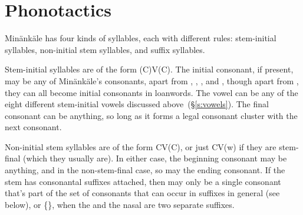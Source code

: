 \section{Phonotactics}
Min\"ank\"ale has four kinds of syllables, each with different rules:
stem-initial syllables, non-initial stem syllables, and suffix syllables.

Stem-initial syllables are of the form (C)V(C). The initial consonant, if
present, may be any of Min\"ank\"ale's consonants, apart from , ,
, and , though apart from , they can all become initial
consonants in loanwords. The vowel can be any of the eight different
stem-initial vowels discussed above~(\S\ref{s:vowels}). The final consonant can
be anything, so long as it forms a legal consonant cluster with the next
consonant.

Non-initial
%
\marginnote{\vspace{1em}}%
stem syllables are of the form CV(C), or just CV(w) if they are stem-final
(which they usually are). In either case, the beginning consonant may be
anything, and in the non-stem-final case, so may the ending consonant. If the
stem has consonantal suffixes attached, then may only be a single consonant
that's part of the set of consonants that can occur in suffixes in general (see
below), or \{\}, when the  and the nasal are two
separate suffixes.

